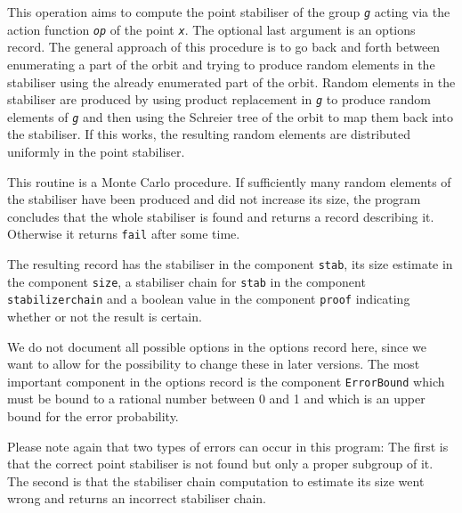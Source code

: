 \documentclass[a4paper,11pt]{report}
\begin{document}
{{{ This operation aims to compute the point stabiliser of the group \mbox{\texttt{\mdseries\slshape g}} acting via the action function \mbox{\texttt{\mdseries\slshape op}} of the point \mbox{\texttt{\mdseries\slshape x}}. The optional last argument is an options record. The general approach of
this procedure is to go back and forth between enumerating a part of the orbit
and trying to produce random elements in the stabiliser using the already
enumerated part of the orbit. Random elements in the stabiliser are produced
by using product replacement in \mbox{\texttt{\mdseries\slshape g}} to produce random elements of \mbox{\texttt{\mdseries\slshape g}} and then using the Schreier tree of the orbit to map them back into the
stabiliser. If this works, the resulting random elements are distributed
uniformly in the point stabiliser. 

 This routine is a Monte Carlo procedure. If sufficiently many random elements
of the stabiliser have been produced and did not increase its size, the
program concludes that the whole stabiliser is found and returns a record
describing it. Otherwise it returns \texttt{fail} after some time. 

 The resulting record has the stabiliser in the component \texttt{stab}, its size estimate in the component \texttt{size}, a stabiliser chain for \texttt{stab} in the component \texttt{stabilizerchain} and a boolean value in the component \texttt{proof} indicating whether or not the result is certain. 

 We do not document all possible options in the options record here, since we
want to allow for the possibility to change these in later versions. The most
important component in the options record is the component \texttt{ErrorBound} which must be bound to a rational number between 0 and 1 and which is an upper
bound for the error probability. 

 Please note again that two types of errors can occur in this program: The
first is that the correct point stabiliser is not found but only a proper
subgroup of it. The second is that the stabiliser chain computation to
estimate its size went wrong and returns an incorrect stabiliser chain. }

  }

  }

  
\end{document}

